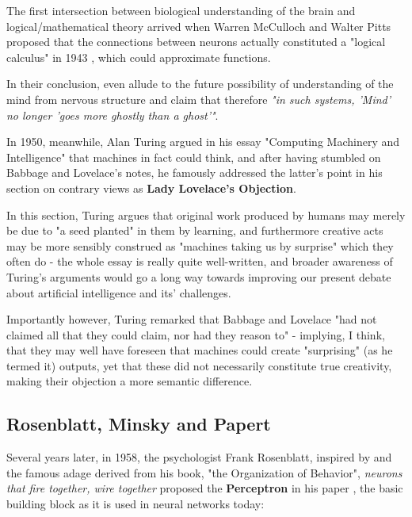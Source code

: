 The first intersection between biological understanding of the brain and logical/mathematical theory arrived when Warren McCulloch and Walter Pitts proposed that the connections between neurons actually constituted a "logical calculus" in 1943 \cite{mcculloch1943logical}, which could approximate functions. 


In their conclusion, \cite{mcculloch1943logical} even allude to the future possibility of understanding of the mind from nervous structure and claim that therefore \textit{"in such systems, 'Mind' no longer 'goes more ghostly than a ghost'"}.

\pagebreak

In 1950, meanwhile, Alan Turing argued in his essay "Computing Machinery and Intelligence" that machines in fact could think, and after having stumbled on Babbage and Lovelace's notes, he famously addressed the latter's point in his section on contrary views as \textbf{Lady Lovelace's Objection}. 

In this section, Turing argues that original work produced by humans may merely be due to "a seed planted" in them by learning, and furthermore creative acts may be more sensibly construed as "machines taking us by surprise" which they often do \cite{turing1950mind} - the whole essay is really quite well-written, and broader awareness of Turing's arguments would go a long way towards improving our present debate about artificial intelligence and its' challenges.

Importantly however, Turing remarked that Babbage and Lovelace "had not claimed all that they could claim, nor had they reason to" - implying, I think, that they may well have foreseen that machines could create "surprising" (as he termed it) outputs, yet that these did not necessarily constitute true creativity, making their objection a more semantic difference.

\pagebreak

\subsection{Rosenblatt, Minsky and Papert}

Several years later, in 1958, the psychologist Frank Rosenblatt, inspired by \cite{hebb1949organisation} and the famous adage derived from his book, "the Organization of Behavior", \textit{neurons that fire together, wire together} proposed the \textbf{Perceptron} in his paper \cite{rosenblatt1958perceptron}, the basic building block as it is used in neural networks today:


